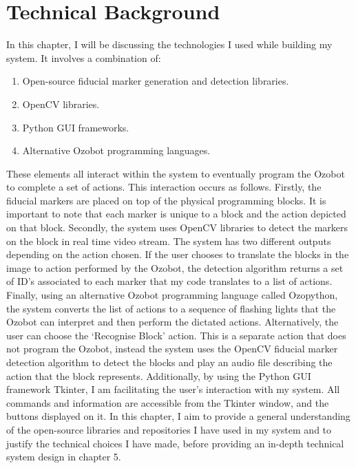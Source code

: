 \documentclass[oneside,%
                    author={Malak Hajji},
                    degree={BSc},
                    title={Designing An Accessible Computational Toolkit For Students},
                  subtitle={With Mixed Visual Abilities}]{dissertation}
\begin{document}

\chapter{Technical Background}
\label{chap:evaluation}



\noindent
In this chapter, I will be discussing the technologies I used while building my system. It involves a combination of:

\begin{enumerate}
\item Open-source fiducial marker generation and detection libraries.
\item OpenCV libraries.
\item Python GUI frameworks. 
\item Alternative Ozobot programming languages.
\end{enumerate}

\noindent
These elements all interact within the system to eventually program the Ozobot to complete a set of actions. This interaction occurs as follows.
 Firstly, the fiducial markers are placed on top of the physical programming blocks. It is important to note that each marker is unique to a block and the action depicted on that block. Secondly, the system uses OpenCV libraries to detect the markers on the block in real time video stream. The system has two different outputs depending on the action chosen. If the user chooses to translate the blocks in the image to action performed by the Ozobot, the detection algorithm returns a set of ID’s associated to each marker that my code translates to a list of actions. Finally, using an alternative Ozobot programming language called Ozopython, the system converts the list of actions to a sequence of flashing lights that the Ozobot can interpret and then perform the dictated actions. 
Alternatively, the user can choose the ‘Recognise Block’ action. This is a separate action that does not program the Ozobot, instead the system uses the OpenCV fiducial marker detection algorithm to detect the blocks and play an audio file describing the action that the block represents. 
Additionally, by using the Python GUI framework Tkinter, I am facilitating the user’s interaction with my system. All commands and information are accessible from the Tkinter window, and the buttons displayed on it. 
In this chapter, I aim to provide a general understanding of the open-source libraries and repositories I have used in my system and to justify the technical choices I have made, before providing an in-depth technical system design in chapter 5.
\end{document}
